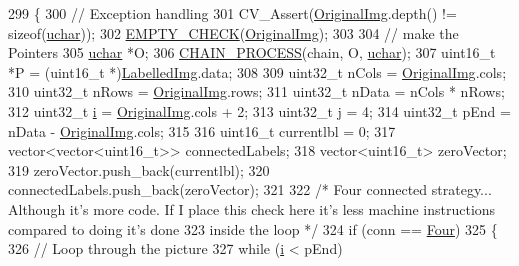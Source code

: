 \begin{DoxyCode}
299     \{
300         \textcolor{comment}{// Exception handling}
301         CV\_Assert(\hyperlink{class_vision_1_1_image_processing_a77c370dab270158a4e9c634e2d3f48e7}{OriginalImg}.depth() != \textcolor{keyword}{sizeof}(\hyperlink{_soil_math_types_8h_a65f85814a8290f9797005d3b28e7e5fc}{uchar}));
302         \hyperlink{_image_processing_8h_a27c4e53b88a0f9f2c097add555131056}{EMPTY\_CHECK}(\hyperlink{class_vision_1_1_image_processing_a77c370dab270158a4e9c634e2d3f48e7}{OriginalImg});
303 
304         \textcolor{comment}{// make the Pointers}
305         \hyperlink{_soil_math_types_8h_a65f85814a8290f9797005d3b28e7e5fc}{uchar} *O;
306         \hyperlink{_image_processing_8h_a6e6f0183cb53c76ef458d4fd34e07bcd}{CHAIN\_PROCESS}(chain, O, \hyperlink{_soil_math_types_8h_a65f85814a8290f9797005d3b28e7e5fc}{uchar});
307         uint16\_t *P = (uint16\_t *)\hyperlink{class_vision_1_1_segment_a4daa143f6cd4a753d3bbe45c6a67d27f}{LabelledImg}.data;
308 
309         uint32\_t nCols = \hyperlink{class_vision_1_1_image_processing_a77c370dab270158a4e9c634e2d3f48e7}{OriginalImg}.cols;
310         uint32\_t nRows = \hyperlink{class_vision_1_1_image_processing_a77c370dab270158a4e9c634e2d3f48e7}{OriginalImg}.rows;
311         uint32\_t nData = nCols * nRows;
312         uint32\_t \hyperlink{_comparision_pictures_2_createtest_image_8m_a6f6ccfcf58b31cb6412107d9d5281426}{i} = \hyperlink{class_vision_1_1_image_processing_a77c370dab270158a4e9c634e2d3f48e7}{OriginalImg}.cols + 2;
313         uint32\_t \hyperlink{_comparision_pictures_2_createtest_image_8m_ac86694252f8dfdb19aaeadc4b7c342c6}{j} = 4;
314         uint32\_t pEnd = nData - \hyperlink{class_vision_1_1_image_processing_a77c370dab270158a4e9c634e2d3f48e7}{OriginalImg}.cols;
315 
316         uint16\_t currentlbl = 0;
317         vector<vector<uint16\_t>> connectedLabels;
318         vector<uint16\_t> zeroVector;
319         zeroVector.push\_back(currentlbl);
320         connectedLabels.push\_back(zeroVector);
321 
322         \textcolor{comment}{/* Four connected strategy... Although it's more code. If I place this check here it's less machine
       instructions compared to doing it's done}
323 \textcolor{comment}{        inside the loop */}
324         \textcolor{keywordflow}{if} (conn == \hyperlink{class_vision_1_1_segment_a330240c08320e72270fac0aa83d5e27ea1fca5ab1c285c0edd2bdc3072cab0c01}{Four})
325         \{
326             \textcolor{comment}{// Loop through the picture}
327             \textcolor{keywordflow}{while} (\hyperlink{_comparision_pictures_2_createtest_image_8m_a6f6ccfcf58b31cb6412107d9d5281426}{i} < pEnd)

\end{DoxyCode}
